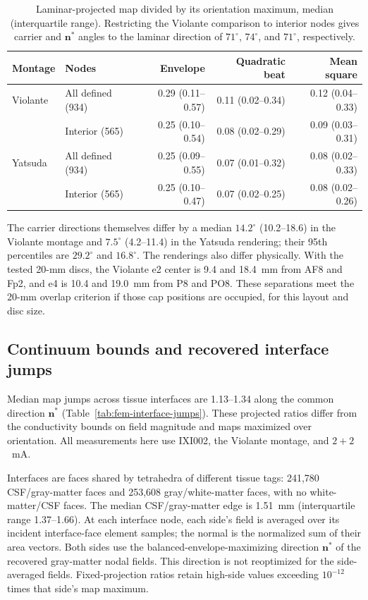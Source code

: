 \documentclass[11pt,a4paper]{article}
\providecommand{\DIFaddtex}[1]{{\protect\color{blue} \sf #1}} %
\providecommand{\DIFadd}[1]{\texorpdfstring{\DIFaddtex{#1}}{#1}} %
\begin{document}
\begin{table}[htbp]
\color{blue}
\centering\small
\begin{tabular}{@{}llrrr@{}}
\toprule
Montage & Nodes & Envelope & Quadratic beat & Mean square\\
\midrule
Violante & All defined (934) & 0.29 (0.11--0.57) & 0.11 (0.02--0.34) & 0.12 (0.04--0.33)\\
 & Interior (565) & 0.25 (0.10--0.54) & 0.08 (0.02--0.29) & 0.09 (0.03--0.31)\\
Yatsuda & All defined (934) & 0.25 (0.09--0.55) & 0.07 (0.01--0.32) & 0.08 (0.02--0.33)\\
 & Interior (565) & 0.25 (0.10--0.47) & 0.07 (0.02--0.25) & 0.08 (0.02--0.26)\\
\bottomrule
\end{tabular}
\caption{\color{blue}Laminar-projected map divided by its orientation maximum, median
(interquartile range). Restricting the Violante comparison to interior nodes
gives carrier and $\mathbf n^*$ angles to the laminar direction of
$71^\circ$, $74^\circ$, and $71^\circ$, respectively.}
\label{tab:fem-laminar-fractions}
\end{table}

\DIFadd{The carrier directions themselves differ by a median $14.2^\circ$
(10.2--18.6) in the Violante montage and $7.5^\circ$ (4.2--11.4) in the
Yatsuda rendering; their 95th percentiles are $29.2^\circ$ and $16.8^\circ$.
The renderings also differ physically. With the tested 20-mm discs, the
Violante e2 center is 9.4 and 18.4~mm from AF8 and Fp2, and e4 is 10.4 and
19.0~mm from P8 and PO8. These separations meet the 20-mm overlap criterion
if those cap positions are occupied, for this layout and disc size.
}

\subsection{\DIFadd{Continuum bounds and recovered interface jumps}}\label{supp:fem-interfaces}
\DIFadd{Median map jumps across tissue interfaces are 1.13--1.34 along the common
direction $\mathbf n^*$ (Table~\ref{tab:fem-interface-jumps}). These
projected ratios differ from the conductivity bounds on field magnitude
and maps maximized over orientation. All measurements here use IXI002,
the Violante montage, and $2+2$~mA.
}

\DIFadd{Interfaces are faces shared by tetrahedra of different tissue tags:
241,780 CSF/gray-matter faces and 253,608 gray/white-matter faces, with no
white-matter/CSF faces. The median CSF/gray-matter edge is 1.51~mm
(interquartile range 1.37--1.66). At each interface node, each side's field
is averaged over its incident interface-face element samples; the normal
is the normalized sum of their area vectors. Both sides use the
balanced-envelope-maximizing direction $\mathbf n^*$ of the recovered
gray-matter nodal fields. This direction is not reoptimized for the
side-averaged fields. Fixed-projection ratios retain high-side values
exceeding $10^{-12}$ times that side's map maximum.
}
\end{document}
